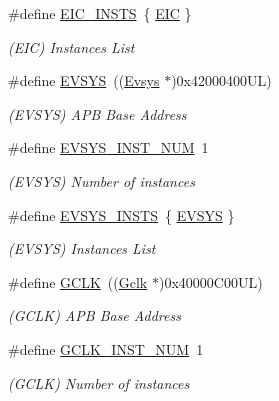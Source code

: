 \begin{DoxyCompactItemize}
\#define \mbox{\hyperlink{group___s_a_m_d21_e15_l__base_ga6cde9c1621d07e94617a55185fd37aa8}{E\+I\+C\+\_\+\+I\+N\+S\+TS}}~\{ \mbox{\hyperlink{group___s_a_m_d21_j18_a__base_ga27183a94584b5fca7e1207ce7a79782a}{E\+IC}} \}
\begin{DoxyCompactList}\small\item\em (E\+IC) Instances List \end{DoxyCompactList}\item 
\#define \mbox{\hyperlink{group___s_a_m_d21_e15_l__base_ga9e745464ad55101201203e77e762b8d1}{E\+V\+S\+YS}}~((\mbox{\hyperlink{struct_evsys}{Evsys}}    $\ast$)0x42000400\+U\+L)
\begin{DoxyCompactList}\small\item\em (E\+V\+S\+YS) A\+PB Base Address \end{DoxyCompactList}\item 
\#define \mbox{\hyperlink{group___s_a_m_d21_e15_l__base_ga583d75632c4ff28dfacb316701432719}{E\+V\+S\+Y\+S\+\_\+\+I\+N\+S\+T\+\_\+\+N\+UM}}~1
\begin{DoxyCompactList}\small\item\em (E\+V\+S\+YS) Number of instances \end{DoxyCompactList}\item 
\#define \mbox{\hyperlink{group___s_a_m_d21_e15_l__base_ga0af5305dde743bb82fbe58740726c78f}{E\+V\+S\+Y\+S\+\_\+\+I\+N\+S\+TS}}~\{ \mbox{\hyperlink{group___s_a_m_d21_j18_a__base_ga9e745464ad55101201203e77e762b8d1}{E\+V\+S\+YS}} \}
\begin{DoxyCompactList}\small\item\em (E\+V\+S\+YS) Instances List \end{DoxyCompactList}\item 
\#define \mbox{\hyperlink{group___s_a_m_d21_e15_l__base_ga23f9186cfd6ee5e60c8485315183271f}{G\+C\+LK}}~((\mbox{\hyperlink{struct_gclk}{Gclk}}     $\ast$)0x40000\+C00\+U\+L)
\begin{DoxyCompactList}\small\item\em (G\+C\+LK) A\+PB Base Address \end{DoxyCompactList}\item 
\#define \mbox{\hyperlink{group___s_a_m_d21_e15_l__base_gae4b5dc7eb760330c53681cda768fe9a2}{G\+C\+L\+K\+\_\+\+I\+N\+S\+T\+\_\+\+N\+UM}}~1
\begin{DoxyCompactList}\small\item\em (G\+C\+LK) Number of instances \end{DoxyCompactList}\item 

\end{DoxyCompactItemize}
